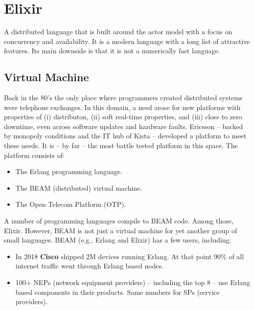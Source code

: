 {
\setmonofont[
  Contextuals={Alternate}
]{Fira Code}

\section{Elixir}

A distributed language that is built around the actor model with a focus on concurrency and availability. It is a modern language with a long list of attractive features. Its main downside is that it is not a numerically fast language.

\subsection{Virtual Machine}

Back in the 80's the only place where programmers created distributed systems were telephone exchanges. In this domain, a need arose for new platforms with properties of (i) distributon, (ii) soft real-time properties, and (iii) close to zero downtime, even across software updates and hardware faults. Ericsson -- backed by monopoly conditions and the IT hub of Kista -- developed a platform to meet these needs. It is -- by far -- the most battle tested platform in this space. The platform consists of:
\begin{itemize}
  \item The Erlang programming language.
  \item The BEAM (distributed) virtual machine.
  \item The Open Telecom Platform (OTP).
\end{itemize}

A number of programming languages compile to BEAM code. Among those, Elixir. However, BEAM is not just a virtual machine for yet another group of small languages. BEAM (e.g., Erlang and Elixir) has a few users, including: 
\begin{itemize}
   is using Elixir to scale to 5M concurrent users.
   uses Erlang to power its chat service serving 100M active users.
   uses Erlang to run messaging servers, each covering 2M users.
   uses Erlang for its GPRS, 3G, 4G and 5G infrastructure, and has a market share of 40\%.
  \item In 2018 \textbf{Cisco} shipped 2M devices running Erlang. At that point 90\% of all internet traffic went through Erlang based nodes.
  \item 100+ NEPs (network equipment providers) -- including the top 8 -- use Erlang based components in their products. Same numbers for SPs (service providers).
\end{itemize}

}
